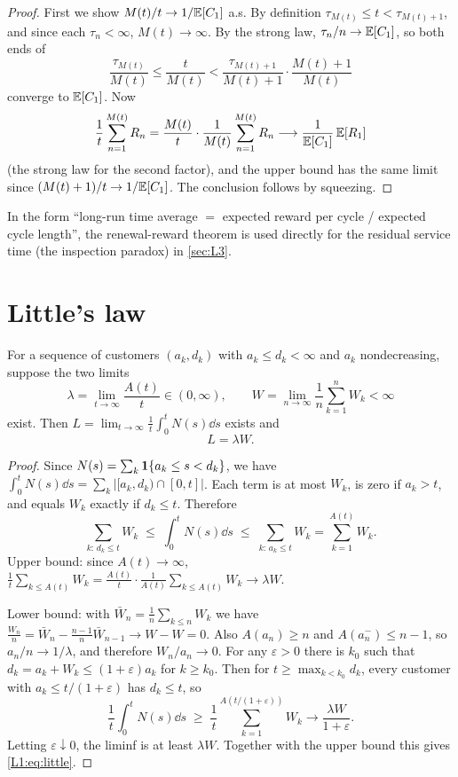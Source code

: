 \begin{proof}
First we show $M(t)/t\to1/\mathbb{E}[C_1]$ a.s. By definition $\tau_{M(t)}\le t<\tau_{M(t)+1}$,
and since each $\tau_n<\infty$, $M(t)\to\infty$. By the strong law,
$\tau_n/n\to\mathbb{E}[C_1]$, so both ends of
\[
  \frac{\tau_{M(t)}}{M(t)}\le\frac{t}{M(t)}<\frac{\tau_{M(t)+1}}{M(t)+1}\cdot\frac{M(t)+1}{M(t)}
\]
converge to $\mathbb{E}[C_1]$. Now
\[
  \frac{1}{t}\sum_{n=1}^{M(t)}R_n=\frac{M(t)}{t}\cdot\frac{1}{M(t)}\sum_{n=1}^{M(t)}R_n
  \longrightarrow\frac{1}{\mathbb{E}[C_1]}\,\mathbb{E}[R_1]
\]
(the strong law for the second factor), and the upper bound has the same limit since
$(M(t)+1)/t\to1/\mathbb{E}[C_1]$. The conclusion follows by squeezing.
\end{proof}

In the form ``long-run time average $=$ expected reward per cycle / expected cycle
length'', the renewal-reward theorem is used directly for the residual service time
(the inspection paradox) in \cref{sec:L3}.

\section{Little's law}

\begin{theorem}\label{thm:little}
For a sequence of customers $(a_k,d_k)$ with $a_k\le d_k<\infty$ and $a_k$
nondecreasing, suppose the two limits
\[
  \lambda=\lim_{t\to\infty}\frac{A(t)}{t}\in(0,\infty),\qquad
  W=\lim_{n\to\infty}\frac1n\sum_{k=1}^nW_k<\infty
\]
exist. Then $L=\lim_{t\to\infty}\frac1t\int_0^tN(s)\dd s$ exists and
\begin{equation}\label{L1:eq:little}
  L=\lambda W .
\end{equation}
\end{theorem}

\begin{proof}
Since $N(s)=\sum_k\mathbf{1}\{a_k\le s<d_k\}$, we have
$\int_0^tN(s)\dd s=\sum_k\bigl|[a_k,d_k)\cap[0,t]\bigr|$.
Each term is at most $W_k$, is zero if $a_k>t$, and equals $W_k$ exactly if
$d_k\le t$. Therefore
\begin{equation}\label{L1:eq:little-sandwich}
  \sum_{k:\,d_k\le t}W_k\;\le\;\int_0^tN(s)\dd s\;\le\;\sum_{k:\,a_k\le t}W_k=\sum_{k=1}^{A(t)}W_k .
\end{equation}
Upper bound: since $A(t)\to\infty$,
$\frac1t\sum_{k\le A(t)}W_k=\frac{A(t)}{t}\cdot\frac{1}{A(t)}\sum_{k\le A(t)}W_k\to\lambda W$.

Lower bound: with $\bar W_n=\frac1n\sum_{k\le n}W_k$ we have
$\frac{W_n}{n}=\bar W_n-\frac{n-1}{n}\bar W_{n-1}\to W-W=0$. Also $A(a_n)\ge n$ and
$A(a_n^-)\le n-1$, so $a_n/n\to1/\lambda$, and therefore $W_n/a_n\to0$.
For any $\varepsilon>0$ there is $k_0$ such that $d_k=a_k+W_k\le(1+\varepsilon)a_k$ for
$k\ge k_0$. Then for $t\ge\max_{k<k_0}d_k$, every customer with
$a_k\le t/(1+\varepsilon)$ has $d_k\le t$, so
\[
  \frac1t\int_0^tN(s)\dd s\;\ge\;\frac1t\sum_{k=1}^{A(t/(1+\varepsilon))}W_k
  \longrightarrow\frac{\lambda W}{1+\varepsilon}.
\]
Letting $\varepsilon\downarrow0$, the liminf is at least $\lambda W$. Together with
the upper bound this gives \eqref{L1:eq:little}.
\end{proof}

